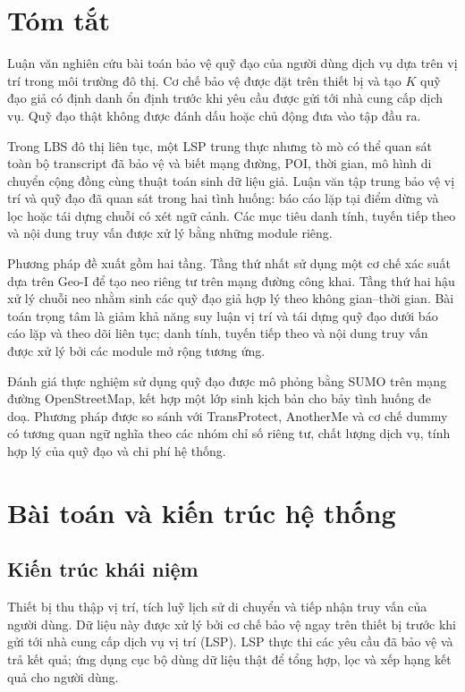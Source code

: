 \documentclass[12pt,a4paper,oneside]{report}
\begin{document}
\chapter*{Tóm tắt}

Luận văn nghiên cứu bài toán bảo vệ quỹ đạo của người dùng dịch vụ dựa trên vị trí trong môi trường đô thị. Cơ chế bảo vệ được đặt trên thiết bị và tạo $K$ quỹ đạo giả có định danh ổn định trước khi yêu cầu được gửi tới nhà cung cấp dịch vụ. Quỹ đạo thật không được đánh dấu hoặc chủ động đưa vào tập đầu ra.

Trong LBS đô thị liên tục, một LSP trung thực nhưng tò mò có thể quan sát toàn bộ transcript đã bảo vệ và biết mạng đường, POI, thời gian, mô hình di chuyển cộng đồng cùng thuật toán sinh dữ liệu giả. Luận văn tập trung bảo vệ vị trí và quỹ đạo đã quan sát trong hai tình huống: báo cáo lặp tại điểm dừng và lọc hoặc tái dựng chuỗi có xét ngữ cảnh. Các mục tiêu danh tính, tuyến tiếp theo và nội dung truy vấn được xử lý bằng những module riêng.

Phương pháp đề xuất gồm hai tầng. Tầng thứ nhất sử dụng một cơ chế xác suất dựa trên Geo-I để tạo neo riêng tư trên mạng đường công khai. Tầng thứ hai hậu xử lý chuỗi neo nhằm sinh các quỹ đạo giả hợp lý theo không gian--thời gian. Bài toán trọng tâm là giảm khả năng suy luận vị trí và tái dựng quỹ đạo dưới báo cáo lặp và theo dõi liên tục; danh tính, tuyến tiếp theo và nội dung truy vấn được xử lý bởi các module mở rộng tương ứng.

Đánh giá thực nghiệm sử dụng quỹ đạo được mô phỏng bằng SUMO trên mạng đường OpenStreetMap, kết hợp một lớp sinh kịch bản cho bảy tình huống đe doạ. Phương pháp được so sánh với TransProtect, AnotherMe và cơ chế dummy có tương quan ngữ nghĩa theo các nhóm chỉ số riêng tư, chất lượng dịch vụ, tính hợp lý của quỹ đạo và chi phí hệ thống.

\chapter{Bài toán và kiến trúc hệ thống}
\label{ch:architecture}

\section{Kiến trúc khái niệm}

Thiết bị thu thập vị trí, tích luỹ lịch sử di chuyển và tiếp nhận truy vấn của người dùng. Dữ liệu này được xử lý bởi cơ chế bảo vệ ngay trên thiết bị trước khi gửi tới nhà cung cấp dịch vụ vị trí (LSP). LSP thực thi các yêu cầu đã bảo vệ và trả kết quả; ứng dụng cục bộ dùng dữ liệu thật để tổng hợp, lọc và xếp hạng kết quả cho người dùng.
\end{document}
